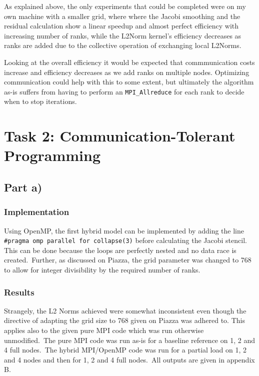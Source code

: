 \documentclass[11pt,a4paper]{article}
\begin{document}
As explained above, the only experiments that could be completed were on my own machine with a smaller grid, where
where the Jacobi smoothing and the residual calculation show a linear speedup and almost perfect efficiency with increasing number of ranks,
while the L2Norm kernel's efficiency decreases as ranks are added due to the collective operation of
exchanging local L2Norms.

Looking at the overall efficiency it would be expected that commmunication costs
increase and efficiency decreases as we add ranks on multiple nodes. Optimizing communication could
help with this to some extent, but ultimately the algorithm as-is suffers from having to 
perform an \texttt{MPI\_Allreduce} for each rank to decide when to stop iterations.



\section{Task 2: Communication-Tolerant Programming}



\subsection{Part a)}
\subsubsection{Implementation}
Using OpenMP, the first hybrid model can be implemented by adding the line
\texttt{\#pragma omp parallel for collapse(3)} before calculating the Jacobi stencil.
This can be done because the loops are perfectly nested and no data race is created.\
Further, as discussed on Piazza, the grid parameter was changed to 768 to allow for
integer divisibility by the required number of ranks.

\subsubsection{Results}
Strangely, the L2 Norms achieved were somewhat inconsistent even though the directive
of adapting the grid size to 768 given on Piazza was adhered to. This applies also
to the given pure MPI code which was run otherwise unmodified.\
The pure MPI code was run as-is for a baseline reference on 1, 2 and 4 full nodes.\
The hybrid MPI/OpenMP code was run for a partial load on 1, 2 and 4 nodes
 and then for 1, 2 and 4 full nodes.\
All outputs are given in appendix B.
\end{document}
